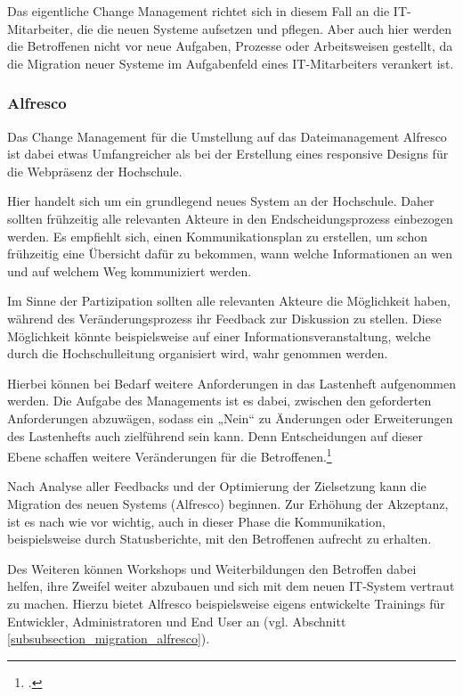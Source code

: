 Das eigentliche Change Management richtet sich in diesem Fall an die IT-Mitarbeiter, die die neuen Systeme aufsetzen und pflegen. Aber auch hier werden die Betroffenen nicht vor neue Aufgaben, Prozesse oder Arbeitsweisen gestellt, da die Migration neuer Systeme im Aufgabenfeld eines IT-Mitarbeiters verankert ist.

\subsubsection{Alfresco}
\label{subsubsection_changemanagement_alfresco}
Das Change Management für die Umstellung auf das Dateimanagement Alfresco ist dabei etwas Umfangreicher als bei der Erstellung eines responsive Designs für die Webpräsenz der Hochschule. 

Hier handelt sich um ein grundlegend neues System an der Hochschule. 
Daher sollten frühzeitig alle relevanten Akteure in den Endscheidungsprozess einbezogen werden. 
Es empfiehlt sich, einen Kommunikationsplan zu erstellen, um schon frühzeitig eine Übersicht dafür zu bekommen, wann welche Informationen an wen und auf welchem Weg kommuniziert werden.

Im Sinne der Partizipation sollten alle relevanten Akteure die Möglichkeit haben, während des Veränderungsprozess ihr Feedback zur Diskussion zu stellen. Diese Möglichkeit könnte beispielsweise auf einer Informationsveranstaltung, welche durch die Hochschulleitung organisiert wird, wahr genommen werden.

Hierbei können bei Bedarf weitere Anforderungen in das Lastenheft aufgenommen werden. Die Aufgabe des Managements ist es dabei, zwischen den geforderten Anforderungen abzuwägen, sodass ein „Nein“ zu Änderungen oder Erweiterungen des Lastenhefts auch zielführend sein kann. Denn Entscheidungen auf dieser Ebene schaffen weitere Veränderungen für die Betroffenen.\footcite[Vgl.][]{kleinhesseling_change_2011}

Nach Analyse aller Feedbacks und der Optimierung der Zielsetzung kann die Migration des neuen Systems (Alfresco) beginnen. Zur Erhöhung der Akzeptanz,  ist es nach wie vor wichtig, auch in dieser Phase die Kommunikation, beispielsweise durch Statusberichte, mit den Betroffenen aufrecht zu erhalten.

Des Weiteren können Workshops und Weiterbildungen den Betroffen dabei helfen, ihre Zweifel weiter abzubauen und sich mit dem neuen IT-System vertraut zu machen. Hierzu bietet Alfresco beispielsweise eigens entwickelte Trainings für Entwickler, Administratoren und End User an (vgl. Abschnitt \ref{subsubsection_migration_alfresco}).

